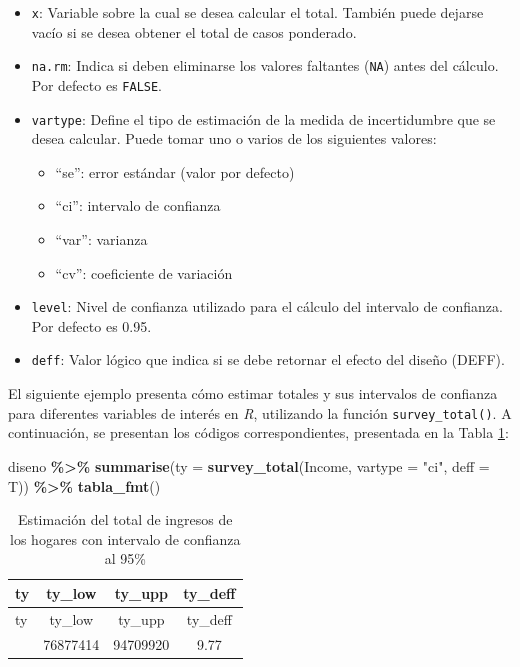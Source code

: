 \documentclass[
  spanish,
  12pt,
]{book}
\newenvironment{Shaded}{\begin{snugshade}}{\end{snugshade}}
\newcommand{\AttributeTok}[1]{\textcolor[rgb]{0.13,0.29,0.53}{#1}}
\newcommand{\FunctionTok}[1]{\textcolor[rgb]{0.13,0.29,0.53}{\textbf{#1}}}
\newcommand{\NormalTok}[1]{#1}
\newcommand{\SpecialCharTok}[1]{\textcolor[rgb]{0.81,0.36,0.00}{\textbf{#1}}}
\newcommand{\StringTok}[1]{\textcolor[rgb]{0.31,0.60,0.02}{#1}}
\providecommand{\tightlist}{%
  \setlength{\itemsep}{0pt}\setlength{\parskip}{0pt}}
\begin{document}
\begin{itemize}
\tightlist
\item
  \texttt{x}: Variable sobre la cual se desea calcular el total. También puede dejarse vacío si se desea obtener el total de casos ponderado.
\item
  \texttt{na.rm}: Indica si deben eliminarse los valores faltantes (\texttt{NA}) antes del cálculo. Por defecto es \texttt{FALSE}.
\item
  \texttt{vartype}: Define el tipo de estimación de la medida de incertidumbre que se desea calcular. Puede tomar uno o varios de los siguientes valores:

  \begin{itemize}
  \tightlist
  \item
    ``se'': error estándar (valor por defecto)
  \item
    ``ci'': intervalo de confianza
  \item
    ``var'': varianza
  \item
    ``cv'': coeficiente de variación
  \end{itemize}
\item
  \texttt{level}: Nivel de confianza utilizado para el cálculo del intervalo de confianza. Por defecto es 0.95.
\item
  \texttt{deff}: Valor lógico que indica si se debe retornar el efecto del diseño (DEFF).
\end{itemize}

El siguiente ejemplo presenta cómo estimar totales y sus intervalos de confianza para diferentes variables de interés en \emph{R}, utilizando la función \texttt{survey\_total()}. A continuación, se presentan los códigos correspondientes, presentada en la Tabla \ref{tab:tab-total-ingreso}:

\begin{Shaded}
\begin{Highlighting}[]
\NormalTok{diseno }\SpecialCharTok{\%\textgreater{}\%} 
  \FunctionTok{summarise}\NormalTok{(}\AttributeTok{ty =} \FunctionTok{survey\_total}\NormalTok{(Income, }\AttributeTok{vartype =} \StringTok{"ci"}\NormalTok{, }\AttributeTok{deff =}\NormalTok{ T)) }\SpecialCharTok{\%\textgreater{}\%}
  \FunctionTok{tabla\_fmt}\NormalTok{()}
\end{Highlighting}
\end{Shaded}

\begin{longtable}[]{@{}lccc@{}}
\caption{\label{tab:tab-total-ingreso}Estimación del total de ingresos de los hogares con intervalo de confianza al 95\%}\tabularnewline
\toprule\noalign{}
ty & ty\_low & ty\_upp & ty\_deff \\
\midrule\noalign{}
\endfirsthead
\toprule\noalign{}
ty & ty\_low & ty\_upp & ty\_deff \\
\midrule\noalign{}
\endhead
\bottomrule\noalign{}
\endlastfoot
85793667 & 76877414 & 94709920 & 9.77 \\
\end{longtable}
\end{document}
